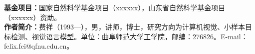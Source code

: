 \documentclass[zihao=5,a4paper,twocolumn]{ctexart}
\begin{document}

\vspace{12pt}
\noindent{}\songti
\textbf{基金项目：}国家自然科学基金项目（xxxxxx），山东省自然科学基金项目（xxxxxx）资助。\\[4pt]
\textbf{作者简介：}费祥（1993—），男，讲师，博士，研究方向为计算机视觉、小样本目标检测、视觉语言模型。单位：曲阜师范大学工学院，邮编：276826。E-mail：felix.fei@qfnu.edu.cn。
\end{document}
